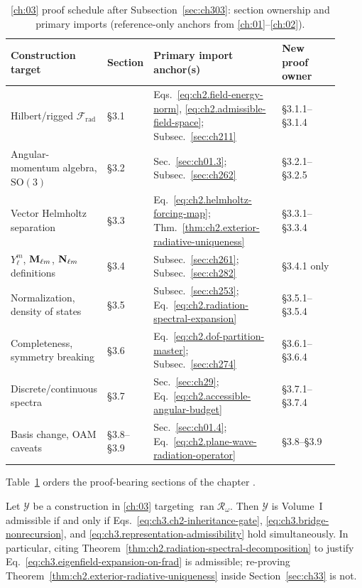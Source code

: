 \begin{table}[t]
\centering
\caption{\ref{ch:03} proof schedule after Subsection~\ref{sec:ch303}: section ownership and
primary imports (reference-only anchors from \ref{ch:01}--\ref{ch:02}).}
\label{tab:ch3.proof-schedule}
\small
\begin{tabular}{@{}p{0.20\linewidth}p{0.13\linewidth}p{0.40\linewidth}p{0.19\linewidth}@{}}
\toprule
Construction target & Section & Primary import anchor(s) & New proof owner \\
\midrule
Hilbert/rigged \(\mathcal{F}_{\mathrm{rad}}\) &
§3.1 &
Eqs.~\eqref{eq:ch2.field-energy-norm}, \eqref{eq:ch2.admissible-field-space};
Subsec.~\ref{sec:ch211} &
§3.1.1--§3.1.4 \\
Angular-momentum algebra, \(\mathrm{SO}(3)\) &
§3.2 &
Sec.~\ref{sec:ch01.3}; Subsec.~\ref{sec:ch262} &
§3.2.1--§3.2.5 \\
Vector Helmholtz separation &
§3.3 &
Eq.~\eqref{eq:ch2.helmholtz-forcing-map}; Thm.~\ref{thm:ch2.exterior-radiative-uniqueness} &
§3.3.1--§3.3.4 \\
\(Y_\ell^m\), \(\mathbf{M}_{\ell m}\), \(\mathbf{N}_{\ell m}\) definitions &
§3.4 &
Subsec.~\ref{sec:ch261}; Subsec.~\ref{sec:ch282} &
§3.4.1 only \\
Normalization, density of states &
§3.5 &
Subsec.~\ref{sec:ch253}; Eq.~\eqref{eq:ch2.radiation-spectral-expansion} &
§3.5.1--§3.5.4 \\
Completeness, symmetry breaking &
§3.6 &
Eq.~\eqref{eq:ch2.dof-partition-master}; Subsec.~\ref{sec:ch274} &
§3.6.1--§3.6.4 \\
Discrete/continuous spectra &
§3.7 &
Sec.~\ref{sec:ch29}; Eq.~\eqref{eq:ch2.accessible-angular-budget} &
§3.7.1--§3.7.4 \\
Basis change, OAM caveats &
§3.8--§3.9 &
Sec.~\ref{sec:ch01.4}; Eq.~\eqref{eq:ch2.plane-wave-radiation-operator} &
§3.8--§3.9 \\
\bottomrule
\end{tabular}
\end{table}
Table~\ref{tab:ch3.proof-schedule} orders the proof-bearing sections of the chapter
\cite{stratton1941}.
\begin{proposition}
\label{prop:ch3.admissible-extensions}
Let \(\mathcal{Y}\) be a construction in \ref{ch:03} targeting
\(\operatorname{ran}\mathcal{R}_\omega\). Then \(\mathcal{Y}\) is Volume~I admissible if and only
if Eqs.~\eqref{eq:ch3.ch2-inheritance-gate}, \eqref{eq:ch3.bridge-nonrecursion}, and
\eqref{eq:ch3.representation-admissibility} hold simultaneously. In particular, citing
Theorem~\ref{thm:ch2.radiation-spectral-decomposition} to justify
Eq.~\eqref{eq:ch3.eigenfield-expansion-on-frad} is admissible; re-proving
Theorem~\ref{thm:ch2.exterior-radiative-uniqueness} inside Section~\ref{sec:ch33} is not.
\end{proposition}
